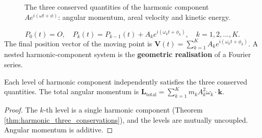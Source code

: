 \begin{figure}[htbp]
\centering
{}
\caption{The three conserved quantities of the harmonic component $Ae^{i(\omega t+\phi)}$: angular momentum, areal velocity and kinetic energy.}
\label{fig:harmonic_conservation}
\end{figure}

\begin{definition}\label{def:nested_harmonic}
\[
P_0(t) = O, \quad P_k(t) = P_{k-1}(t) + A_k e^{i(\omega_k t + \phi_k)}, \quad k = 1, 2, \dots, K.
\]
The final position vector of the moving point is $\mathbf{V}(t) = \sum_{k=1}^{K} A_k e^{i(\omega_k t + \phi_k)}$. A nested harmonic-component system is the \textbf{geometric realisation} of a Fourier series.
\end{definition}

\begin{theorem}\label{thm:nested_harmonic_conservation}
Each level of harmonic component independently satisfies the three conserved quantities. The total angular momentum is $\mathbf{L}_{\text{total}} = \sum_{k=1}^{K} m_k A_k^2 \omega_k \cdot \mathbf{k}$.
\end{theorem}

\begin{proof}
The $k$-th level is a single harmonic component (Theorem \ref{thm:harmonic_three_conservations}), and the levels are mutually uncoupled. Angular momentum is additive.
\end{proof}

